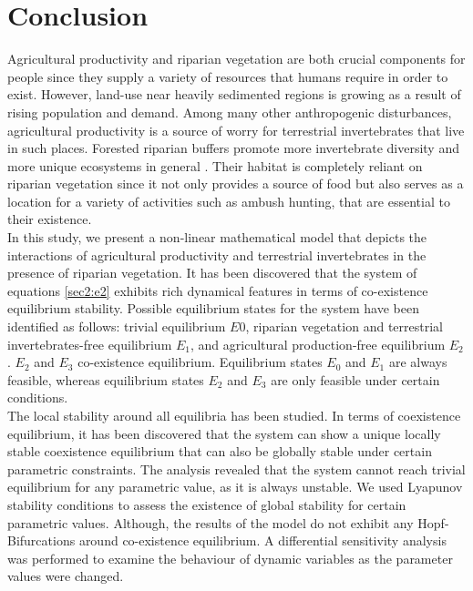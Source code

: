 \documentclass[12pt]{article}
\numberwithin{equation}{section}
\begin{document}
\section{Conclusion}
 Agricultural productivity and riparian vegetation are both crucial components for people since they supply a variety of resources that humans require in order to exist. However, land-use near heavily sedimented regions is growing as a result of rising population and demand. Among many other anthropogenic disturbances, agricultural productivity is a source of worry for terrestrial invertebrates that live in such places. Forested riparian buffers promote more invertebrate diversity and more unique ecosystems in general \cite{popescu2021riparian}. Their habitat is completely reliant on riparian vegetation since it not only provides a source of food but also serves as a location for a variety of activities such as ambush hunting, that are essential to their existence.\\
In this study, we present a non-linear mathematical model that depicts the interactions of agricultural productivity and terrestrial invertebrates in the presence of riparian vegetation. It has been discovered that the system of equations \eqref{sec2:e2} exhibits rich dynamical features in terms of co-existence equilibrium stability. Possible equilibrium states for the system have been identified as follows: trivial equilibrium $E 0$, riparian vegetation and terrestrial invertebrates-free equilibrium $E_1$, and agricultural production-free equilibrium $E_2$. $E_2$ and $E_3$ co-existence equilibrium. Equilibrium states $E_0$ and $E_1$ are always feasible, whereas equilibrium states $E_2$ and $E_3$ are only feasible under certain conditions.\\
The local stability around all equilibria has been studied. In terms of coexistence equilibrium, it has been discovered that the system can show a unique locally stable coexistence equilibrium that can also be globally stable under certain parametric constraints. The analysis revealed that the system cannot reach trivial equilibrium for any parametric value, as it is always unstable. We used Lyapunov stability conditions to assess the existence of global stability for certain parametric values. Although, the results of the model do not exhibit any Hopf-Bifurcations around co-existence equilibrium. A differential sensitivity analysis was performed to examine the behaviour of dynamic variables as the parameter values were changed.\\
\end{document}
